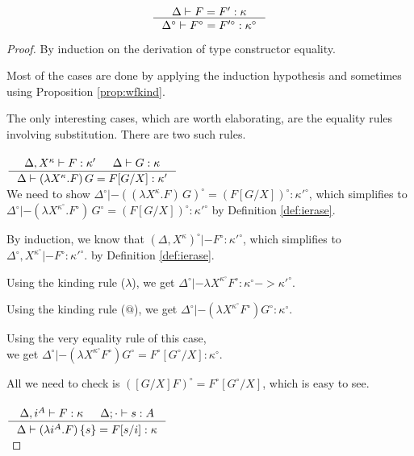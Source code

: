 \begin{theorem}
\[ \inference{\Delta |- F=F':\kappa}
		{\Delta^\circ |- F^\circ=F'^\circ:\kappa^\circ}
\]
\label{thm:ierasetyconeq}
\end{theorem}
\begin{proof}
By induction on the derivation of type constructor equality.

Most of the cases are done by applying the induction hypothesis
and sometimes using Proposition \ref{prop:wfkind}.

The only interesting cases, which are worth elaborating, are
the equality rules involving substitution.
There are two such rules.

\paragraph{}
  $\inference{\Delta,X^\kappa |- F:\kappa' & \Delta |- G:\kappa}
             {\Delta |- (\lambda X^\kappa.F)\,G = F[G/X]:\kappa'}$ \\

We need to show
$ \Delta^\circ |- ((\lambda X^\kappa.F)\,G)^\circ = (F[G/X])^\circ : \kappa'^\circ $,
which simplifies to 
$ \Delta^\circ |- (\lambda X^{\kappa^\circ}.F^\circ)\,G^\circ = (F[G/X])^\circ : \kappa'^\circ $
by Definition \ref{def:ierase}.

By induction, we know that $(\Delta,X^\kappa)^\circ |- F^\circ : \kappa'^\circ$,
which simplifies to $\Delta^\circ,X^{\kappa^\circ} |- F^\circ : \kappa'^\circ$.
by Definition \ref{def:ierase}.

Using the kinding rule ($\lambda$), we get
$\Delta^\circ |- \lambda X^{\kappa^\circ} F^\circ : \kappa^\circ -> \kappa'^\circ$.

Using the kinding rule ($@$), we get
$\Delta^\circ |- (\lambda X^{\kappa^\circ} F^\circ) G^\circ : \kappa^\circ$.

Using the very equality rule of this case,\\ we get 
$\Delta^\circ |- (\lambda X^{\kappa^\circ} F^\circ) G^\circ =  F^\circ[G^\circ/X] : \kappa^\circ$.

All we need to check is $([G/X]F)^\circ = F^\circ[G^\circ/X]$,
which is easy to see.

\paragraph{}
  $\inference{\Delta,i^A |- F:\kappa & \Delta;\cdot |- s:A}
             {\Delta |- (\lambda i^A.F)\,\{s\} = F[s/i]:\kappa}$ \\


\end{proof}

